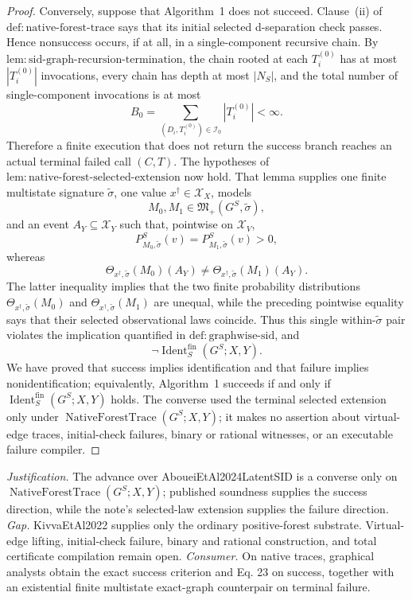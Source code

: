 \documentclass{article}
\begin{document}
\begin{proof}
Conversely, suppose that Algorithm~1 does not succeed.  Clause~(ii) of \(\mathrm{def:native\text{-}forest\text{-}trace}\) says that its initial selected d-separation check passes.  Hence nonsuccess occurs, if at all, in a single-component recursive chain.  By \(\mathrm{lem:sid\text{-}graph\text{-}recursion\text{-}termination}\), the chain rooted at each \(T_i^{(0)}\) has at most \(|T_i^{(0)}|\) invocations, every chain has depth at most \(|N_S|\), and the total number of single-component invocations is at most
\[
 B_0=\sum_{(D_i,T_i^{(0)})\in\mathcal I_0}|T_i^{(0)}|<\infty.
\]
Therefore a finite execution that does not return the success branch reaches an actual terminal failed call \((C,T)\).  The hypotheses of \(\mathrm{lem:native\text{-}forest\text{-}selected\text{-}extension}\) now hold.  That lemma supplies one finite multistate signature \(\widetilde\sigma\), one value \(x^\dagger\in\mathcal X_X\), models
\[
 M_0,M_1\in\mathfrak M_+(G^S,\widetilde\sigma),
\]
and an event \(A_Y\subseteq\mathcal X_Y\) such that, pointwise on \(\mathcal X_V\),
\[
 P_{M_0,\widetilde\sigma}^S(v)
 =P_{M_1,\widetilde\sigma}^S(v)>0,
\]
whereas
\[
 \Theta_{x^\dagger,\widetilde\sigma}(M_0)(A_Y)
 \ne
 \Theta_{x^\dagger,\widetilde\sigma}(M_1)(A_Y).
\]
The latter inequality implies that the two finite probability distributions \(\Theta_{x^\dagger,\widetilde\sigma}(M_0)\) and \(\Theta_{x^\dagger,\widetilde\sigma}(M_1)\) are unequal, while the preceding pointwise equality says that their selected observational laws coincide.  Thus this single within-\(\widetilde\sigma\) pair violates the implication quantified in \(\mathrm{def:graphwise\text{-}sid}\), and
\[
 \neg\operatorname{Ident}^{\mathrm{fin}}_S(G^S;X,Y).
\]
We have proved that success implies identification and that failure implies nonidentification; equivalently, Algorithm~1 succeeds if and only if \(\operatorname{Ident}^{\mathrm{fin}}_S(G^S;X,Y)\) holds.  The converse used the terminal selected extension only under \(\operatorname{NativeForestTrace}(G^S;X,Y)\); it makes no assertion about virtual-edge traces, initial-check failures, binary or rational witnesses, or an executable failure compiler.
\end{proof}
\par\smallskip\noindent \textit{Justification.} The advance over AboueiEtAl2024LatentSID is a converse only on \(\operatorname{NativeForestTrace}(G^S;X,Y)\); published soundness supplies the success direction, while the note's selected-law extension supplies the failure direction. \textit{Gap.} KivvaEtAl2022 supplies only the ordinary positive-forest substrate. Virtual-edge lifting, initial-check failure, binary and rational construction, and total certificate compilation remain open. \textit{Consumer.} On native traces, graphical analysts obtain the exact success criterion and Eq. 23 on success, together with an existential finite multistate exact-graph counterpair on terminal failure.
\end{document}
